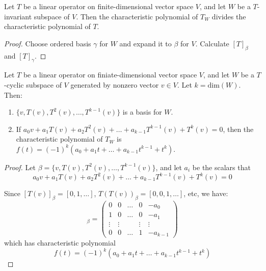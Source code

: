 \begin{theorem}
    Let $T$ be a linear operator on finite-dimensional vector space $V$, and let $W$ be a $T$-invariant subspace of $V$. Then the characteristic polynomial of $T_W$ divides the characteristic polynomial of $T$.
\end{theorem}

\begin{proof}
    Choose ordered basis $\gamma$ for $W$ and expand it to $\beta$ for $V$. Calculate $[T]_\beta$ and $[T]_\gamma$.
\end{proof}


\begin{theorem}
    Let $T$ be a linear operator on finiate-dimensional vector space $V$, and let $W$ be a $T$-cyclic subspace of $V$ generated by nonzero vector $v \in V$. Let $k = \text{dim}(W)$. Then:
    \begin{enumerate}
        \item $\{v, T(v), T^2(v), \dots, T^{k-1}(v)\}$ is a basis for $W$.
        \item If $a_0 v + a_1 T(v) + a_2 T^2(v) + \dots + a_{k-1} T^{k-1}(v) + T^k(v) = 0$, then the characteristic polynomial of $T_W$ is $f(t) = (-1)^k (a_0 + a_1 t + \dots + a_{k-1} t^{k-1} + t^k)$.
    \end{enumerate}
\end{theorem}

\begin{proof}
    Let $\beta = \{v, T(v), T^2(v), \dots, T^{k-1}(v)\}$, and let $a_i$ be the scalars that 
    \begin{equation*}
            a_0 v + a_1 T(v) + a_2 T^2(v) + \dots + a_{k-1} T^{k-1}(v) + T^k(v) = 0
    \end{equation*}
    
    Since $[T(v)]_\beta = [0,1,\dots]$, $T(T(v))_\beta = [0,0,1,\dots]$, etc, we have:
    \begin{equation*}
        [T_W]_\beta = \begin{pmatrix}
            0 & 0 & \dots & 0 & - a_0 \\
            1 & 0 & \dots & 0 & -a_1\\
            \vdots & \vdots  & & \vdots & \vdots \\
            0 & 0 & \dots & 1 & - a_{k-1}
        \end{pmatrix}
    \end{equation*}
    which has characteristic polynomial 
    \begin{equation*}
        f(t) = (-1)^k (a_0 + a_1 t + \dots + a_{k-1} t^{k-1} + t^k)
    \end{equation*}
\end{proof}

